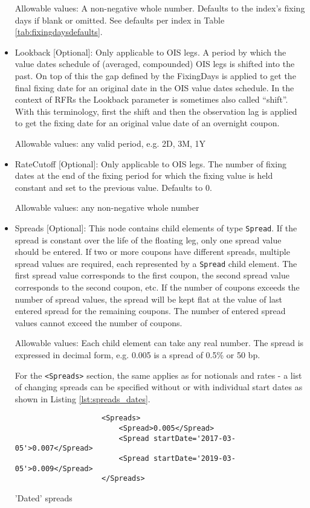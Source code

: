 \begin{itemize}
  Allowable values: A non-negative whole number.  Defaults to the index's fixing days if blank or omitted. See defaults per index in Table \ref{tab:fixingdaysdefaults}.

\item Lookback [Optional]: Only applicable to OIS legs. A period by which the value dates schedule of (averaged,
  compounded) OIS legs is shifted into the past. On top of this the gap defined by the FixingDays is applied to get the
  final fixing date for an original date in the OIS value dates schedule. In the context of RFRs the Lookback
  parameter is sometimes also called ``shift''. With this terminology, first the shift and then the observation lag is
  applied to get the fixing date for an original value date of an overnight coupon.

  Allowable values: any valid period, e.g. 2D, 3M, 1Y

\item RateCutoff [Optional]: Only applicable to OIS legs. The number of fixing dates at the end of the fixing period for
  which the fixing value is held constant and set to the previous value. Defaults to $0$.

Allowable values: any non-negative whole number

\item Spreads [Optional]: This node contains child elements of type
  \lstinline!Spread!. If the spread is constant over the life of the
  floating leg, only one spread value should be entered. If two or more
  coupons have different spreads, multiple spread values are required,
  each represented by a \lstinline!Spread! child element. The first
  spread value corresponds to the first coupon, the second spread
  value corresponds to the second coupon, etc. If the number of
  coupons exceeds the number of spread values, the spread will be kept
  flat at the value of last entered spread for the remaining coupons.
  The number of entered spread values cannot exceed the number of
  coupons. 

  Allowable values: Each child element can take any real number. The spread is expressed in decimal form, e.g. 0.005 is
  a spread of 0.5\% or 50 bp. 

For the {\tt <Spreads>} section, the same applies as for notionals and
rates - a list of changing spreads can be specified without or with individual start dates as shown
in Listing \ref{lst:spreads_dates}.
\begin{listing}[H]
\begin{verbatim}
                    <Spreads>
                        <Spread>0.005</Spread>
                        <Spread startDate='2017-03-05'>0.007</Spread>
                        <Spread startDate='2019-03-05'>0.009</Spread>
                    </Spreads>
\end{verbatim}
\caption{'Dated' spreads}
\label{lst:spreads_dates}
\end{listing}


\end{itemize}
